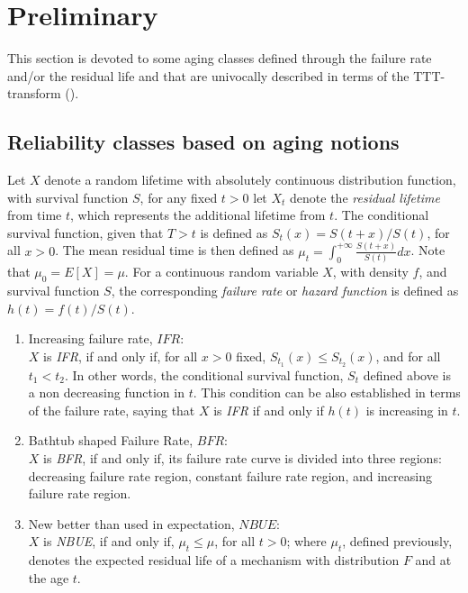 \documentclass[preprint,12pt]{elsarticle}
\begin{document}
\section{Preliminary}\label{sec:pre}
This section is devoted to some aging classes defined through the failure rate and/or the residual life and that are univocally described in terms of the TTT-transform (\cite{Klefsjo82}).

\subsection{Reliability classes based on aging notions}
Let $X$ denote a random lifetime with absolutely continuous distribution function, with survival function $S$, for any fixed $t>0$ let $X_t$ denote the \textit{residual lifetime} from time $t$, which represents the additional lifetime from $t$. The conditional survival function, given that $T>t$ is defined as $S_t(x)=S(t+x)/S(t)$, for all $x >0$. The mean residual time is then defined as $\mu_t= \int_0^{+\infty} \frac{S(t+x)}{S(t)}dx$. Note that $\mu_0=E[X]=\mu$. For a continuous random variable $X$, with density $f$, and survival function $S$, the corresponding \textit{failure rate} or \textit{hazard function} is defined as $h(t)=f(t)/S(t)$.

\begin{enumerate}
\item Increasing failure rate, $IFR$:\\
\noindent $X$ is {\it IFR}, if and only if, for all $x>0 $ fixed, $S_{t_1}(x) \leq S_{t_2}(x)$,  and for all $t_1 < t_2$. In other words, the conditional survival function, $S_t$ defined above is a non decreasing function in $t$. This condition can be also established in terms of the failure rate, saying that $X$ is {\it IFR} if and only if $h(t)$ is increasing  in $t$.

\item Bathtub shaped Failure Rate, $BFR$:\\
\noindent $X$ is  {\it BFR}, if and only if, its  failure rate curve is divided into three regions: decreasing failure rate region, constant failure rate region, and increasing failure rate region.



\item New better than used in expectation, $NBUE$:\\
 \noindent $X$  is {\it NBUE}, if and only if,  $\mu_t \leq  \mu$, for all $t>0$; where $\mu_t$, defined previously, denotes the expected residual life of a mechanism with distribution $F$ and at the age $t$.
\end{enumerate}
\end{document}
